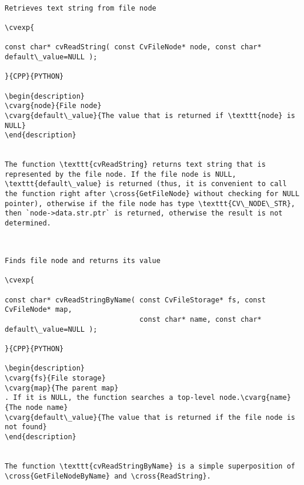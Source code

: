 \begin{verbatim}

Retrieves text string from file node

\cvexp{

const char* cvReadString( const CvFileNode* node, const char* default\_value=NULL );

}{CPP}{PYTHON}

\begin{description}
\cvarg{node}{File node}
\cvarg{default\_value}{The value that is returned if \texttt{node} is NULL}
\end{description}


The function \texttt{cvReadString} returns text string that is represented by the file node. If the file node is NULL, \texttt{default\_value} is returned (thus, it is convenient to call the function right after \cross{GetFileNode} without checking for NULL pointer), otherwise if the file node has type \texttt{CV\_NODE\_STR}, then `node->data.str.ptr` is returned, otherwise the result is not determined.


\end{verbatim}
\begin{verbatim}

Finds file node and returns its value

\cvexp{

const char* cvReadStringByName( const CvFileStorage* fs, const CvFileNode* map,
                                const char* name, const char* default\_value=NULL );

}{CPP}{PYTHON}

\begin{description}
\cvarg{fs}{File storage}
\cvarg{map}{The parent map}
. If it is NULL, the function searches a top-level node.\cvarg{name}{The node name}
\cvarg{default\_value}{The value that is returned if the file node is not found}
\end{description}


The function \texttt{cvReadStringByName} is a simple superposition of \cross{GetFileNodeByName} and \cross{ReadString}.


\end{verbatim}

